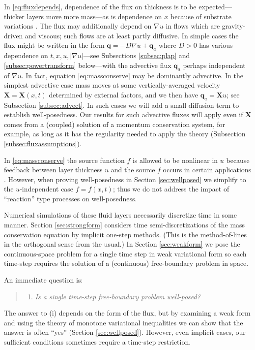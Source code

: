 \documentclass[final,onefignum]{siamart190516}
\newcommand\bq{\mathbf{q}}
\newcommand\bX{\mathbf{X}}
\newcommand{\grad}{\nabla}
\begin{document}
In \eqref{eq:fluxdepends}, dependence of the flux on thickness is to be expected---thicker layers move more mass---as is dependence on $x$ because of substrate variations \cite[for example]{Bueler2016}.  The flux may additionally depend on $\grad u$ in flows which are gravity-driven and viscous; such flows are at least partly diffusive.  In simple cases the flux might be written in the form $\bq=- D \grad u + \bq_a$ where $D > 0$ has various dependence on $t,x,u,|\grad u|$---see Subsections \ref{subsec:plap} and \ref{subsec:powertransform} below---with the advective flux $\bq_a$ perhaps independent of $\grad u$.  In fact, equation \eqref{eq:massconserve} may be dominantly advective.  In the simplest advective case mass moves at some vertically-averaged velocity $\bX=\bX(x,t)$ determined by external factors, and we then have $\bq_a = \bX u$; see Subsection \ref{subsec:advect}.  In such cases we will add a small diffusion term to establish well-posedness.  Our results for such advective fluxes will apply even if $\bX$ comes from a (coupled) solution of a momentum conservation system, for example, as long as it has the regularity needed to apply the theory (Subsection \ref{subsec:fluxassumptions}).

In \eqref{eq:massconserve} the source function $f$ is allowed to be nonlinear in $u$ because feedback between layer thickness $u$ and the source $f$ occurs in certain applications \cite{Jouvetetal2011}.  However, when proving well-posedness in Section \ref{sec:wellposed} we simplify to the $u$-independent case $f=f(x,t)$; thus we do not address the impact of ``reaction'' type processes on well-posedness.

Numerical simulations of these fluid layers necessarily discretize time in some manner.  Section \ref{sec:strongform} considers time semi-discretizations of the mass conservation equation by implicit one-step methods.  (This is the method-of-lines in the orthogonal sense from the usual.)  In Section \ref{sec:weakform} we pose the continuous-space problem for a single time step in weak variational form so each time-step requires the solution of a (continuous) free-boundary problem in space.

An immediate question is:
  \begin{quote}
  \renewcommand{\labelenumi}{(\roman{enumi})}
  \begin{enumerate}
  \item \emph{Is a single time-step free-boundary problem well-posed?}
  \end{enumerate}
  \end{quote}
The answer to (i) depends on the form of the flux, but by examining a weak form and using the theory of monotone variational inequalities \cite{KinderlehrerStampacchia1980} we can show that the answer is often ``yes'' (Section \ref{sec:wellposed}).  However, even implicit cases, our sufficient conditions sometimes require a time-step restriction.
\end{document}
